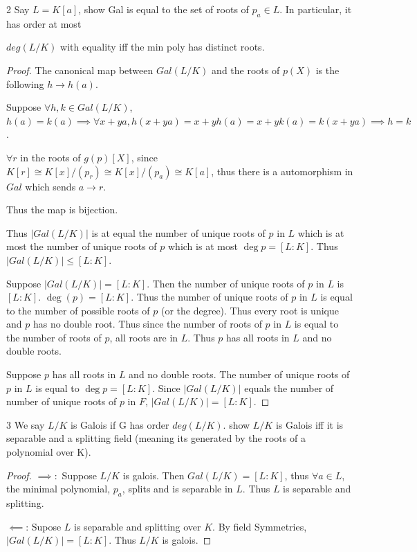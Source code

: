 \documentclass{article}
\begin{document}
\bigskip

\begin{PROB}{2}\label{Problem 2.}
    Say $L = K[a]$, show Gal is equal to the set of roots of $p_a \in L$. In particular, it has order at most 

$deg(L/K)$ with equality iff the min poly has distinct roots. 
\end{PROB}
\begin{proof}
    The canonical map between $Gal(L / K)$ and the roots of $p(X)$ is the following $h \to h(a)$.

    Suppose $\forall h, k \in Gal(L / K)$, $h(a) = k(a) \implies \forall x + ya, h(x + ya) = x + yh(a) = x + yk(a) = k(x+ya) \implies h = k$.
    
    $\forall r$ in the roots of $g(p)[X]$, since $K[r] \cong K[x] / (p_r) \cong K[x] / (p_a) \cong K[a]$, thus there is a automorphism in $Gal$ which sends $a \to r$.   
    
    Thus the map is bijection.  

    Thus $|Gal(L / K)|$ is at equal the number of unique roots of $p$ in $L$ which is at most the number of unique roots of $p$ which is at most $\deg p = [L : K]$. Thus $|Gal(L / K)| \leq [L : K]$.

    Suppose $|Gal(L / K)| = [L : K]$. Then the number of unique roots of $p$ in $L$  is $[L : K]$. $\deg(p) = [L : K]$. Thus the number of unique roots of $p$ in $L$  is equal to the number of possible roots of $p$ (or the degree). Thus every root is unique and $p$ has no double root. Thus since the number of roots of $p$ in $L$ is equal to the number of roots of $p$, all roots are in $L$. Thus $p$ has all roots in $L$ and no double roots. 
    
    Suppose $p$ has all roots in $L$ and no double roots. The number of unique roots of $p$ in $L$ is equal to $\deg p = [L: K]$. Since $|Gal(L / K)|$ equals the number of number of unique roots of $p$ in $F$, $|Gal(L / K)| = [L : K]$.       
\end{proof}

\bigskip

\begin{PROB}{3}\label{Problem 3.}
    We say $L/K$ is Galois if G has order $deg(L/K)$. 
show $L/K$ is Galois iff  it is separable and a splitting field  (meaning its generated by
the roots of a polynomial over K).  
\end{PROB}
\begin{proof}
    $\implies: $ Suppose $L / K$ is galois. Then $Gal(L / K) = [L : K]$, thus $\forall a \in L$, the minimal polynomial, $p_a$, splits and is separable in $L$. Thus $L$ is separable and splitting. 
    
    $\impliedby$: Supose $L$ is separable and splitting over $K$. By field Symmetries, $|Gal(L / K)| = [L : K]$. Thus $L / K$ is galois.      
\end{proof}
\end{document}
